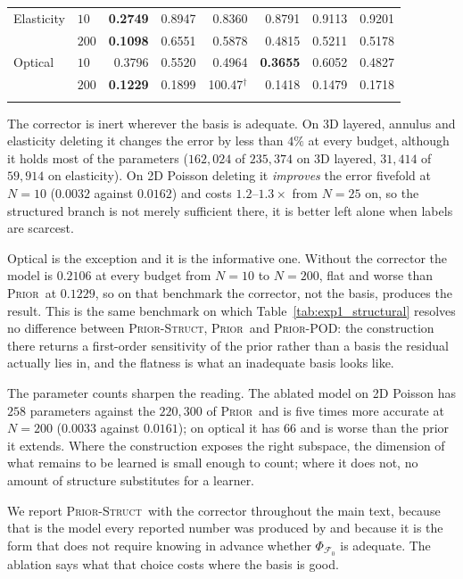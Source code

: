 \documentclass{article}
\newcommand{\armprior}{\textsc{Prior}}
\newcommand{\armstruct}{\textsc{Prior-Struct}}
\newcommand{\armpod}{\textsc{Prior-POD}}
\begin{document}
\begin{table}[t]
\begin{tabular}{@{}llrrrrrr@{}}
        \addlinespace[2pt]
        Elasticity & $10$ & \textbf{0.2749} & 0.8947 & 0.8360 & 0.8791 & 0.9113 & 0.9201 \\
         & $200$ & \textbf{0.1098} & 0.6551 & 0.5878 & 0.4815 & 0.5211 & 0.5178 \\
        \addlinespace[2pt]
        Optical & $10$ & 0.3796 & 0.5520 & 0.4964 & \textbf{0.3655} & 0.6052 & 0.4827 \\
         & $200$ & \textbf{0.1229} & 0.1899 & 100.47$^\dagger$ & 0.1418 & 0.1479 & 0.1718 \\
        \addlinespace[2pt]
        \bottomrule
    \end{tabular}
    \vspace{-3mm}
\end{table}


The corrector is inert wherever the basis is adequate. On 3D layered, annulus and elasticity
deleting it changes the error by less than $4\%$ at every budget, although it holds most of the
parameters ($162{,}024$ of $235{,}374$ on 3D layered, $31{,}414$ of $59{,}914$ on elasticity). On
2D Poisson deleting it \emph{improves} the error fivefold at $N{=}10$ ($0.0032$ against $0.0162$)
and costs $1.2$--$1.3\times$ from $N{=}25$ on, so the structured branch is not merely sufficient
there, it is better left alone when labels are scarcest.

Optical is the exception and it is the informative one. Without the corrector the model is
$0.2106$ at every budget from $N{=}10$ to $N{=}200$, flat and worse than \armprior\ at
$0.1229$, so on that benchmark the corrector, not the basis, produces the result. This is the
same benchmark on which Table~\ref{tab:exp1_structural} resolves no difference between
\armstruct, \armprior\ and \armpod: the construction there returns a first-order sensitivity of
the prior rather than a basis the residual actually lies in, and the flatness is what an
inadequate basis looks like.

The parameter counts sharpen the reading. The ablated model on 2D Poisson has $258$ parameters
against the $220{,}300$ of \armprior\ and is five times more accurate at $N{=}200$ ($0.0033$
against $0.0161$); on optical it has $66$ and is worse than the prior it extends. Where the
construction exposes the right subspace, the dimension of what remains to be learned is small
enough to count; where it does not, no amount of structure substitutes for a learner.

We report \armstruct\ with the corrector throughout the main text, because that is the model every
reported number was produced by and because it is the form that does not require knowing in
advance whether $\Phi_{\mathcal{F}_0}$ is adequate. The ablation says what that choice costs where
the basis is good.
\end{document}
